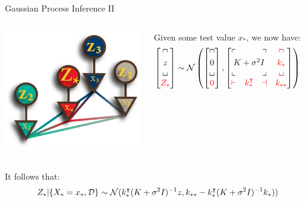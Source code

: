 \documentclass[aspectratio=169,19pt,xetex,handout]{beamer}
\renewcommand{\bot}{\llcorner\!\!\lrcorner} %
\renewcommand{\top}{\ulcorner\!\!\urcorner} %
\begin{document}
\begin{frame}{Gaussian Process Inference II}
\Large

\begin{columns}[T] %
\includegraphics[width=\textwidth]{gp_inference}

Given some test value $x_*$, we now have:
\begin{align*}
\begin{bmatrix} \top \\ z \\ \bot \\ \textcolor{red}{Z_*} \end{bmatrix} 
& \sim \N\left(\begin{bmatrix} \top \\ 0 \\ \bot \\ \textcolor{red}{0} \end{bmatrix}, \begin{bmatrix} \ulcorner &  & \urcorner & \textcolor{red}{\top} \\  \multicolumn{3}{c}{K+\sigma^2 I}   & \textcolor{red}{k_*} \\ \llcorner &  & \lrcorner &  \textcolor{red}{\bot} \\ \textcolor{red}{\vdash} & \textcolor{red}{k_{*}^\tr} & \textcolor{red}{\dashv} &  \textcolor{red}{k_{**}} \end{bmatrix} \right)
\end{align*}
\end{columns}
It follows that:
\[
Z_*|\{X_*=x_*, \mathcal{D}\}
\sim \mathcal{N}(k_*^\intercal (K+\sigma^2I)^{-1} z, k_{**} - k_*^\intercal (K+\sigma^2I)^{-1} k_*))
\]

\end{frame}
\end{document}
